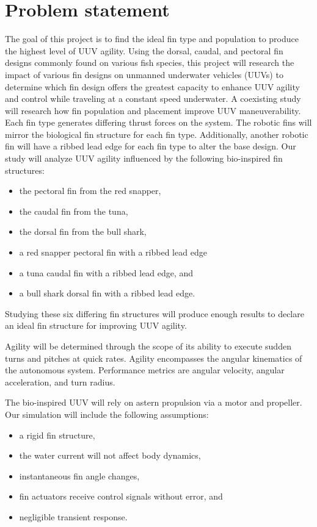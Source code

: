 \documentclass[]{IEEEtran}
\begin{document}
\section{Problem statement}
The goal of this project is to find the ideal fin type and population to produce the highest level of UUV agility.  Using the dorsal, caudal, and pectoral fin designs commonly found on various fish species, this project will research the impact of various fin designs on unmanned underwater vehicles (UUVs) to determine which fin design offers the greatest capacity to enhance UUV agility and control while traveling at a constant speed underwater.   A coexisting study will research how fin population and placement improve UUV maneuverability.   Each fin type generates differing thrust forces on the system.  The robotic fins will mirror the biological fin structure for each fin type. Additionally, another robotic fin will have a ribbed lead edge for each fin type to alter the base design.  Our study will analyze UUV agility influenced by the following bio-inspired fin structures:
\begin{itemize}
\item the pectoral fin from the red snapper,
\item the caudal fin from the tuna, 
\item the dorsal fin from the bull shark,
\item a red snapper pectoral fin with a ribbed lead edge
\item a tuna caudal fin with a ribbed lead edge, and
\item a bull shark dorsal fin with a ribbed lead edge.  
\end{itemize}
Studying these six differing fin structures will produce enough results to declare an ideal fin structure for improving UUV agility.   

Agility will be determined through the scope of its ability to execute sudden turns and pitches at quick rates.  Agility encompasses the angular kinematics of the autonomous system.  Performance metrics are angular velocity, angular acceleration, and turn radius.

The bio-inspired UUV will rely on astern propulsion via a motor and propeller. Our simulation will include the following assumptions:
\begin{itemize}
\item a rigid fin structure,  
\item the water current will not affect body dynamics,  
\item instantaneous fin angle changes,
\item fin actuators receive control signals without error, and
\item negligible transient response.
\end{itemize}
\end{document}
